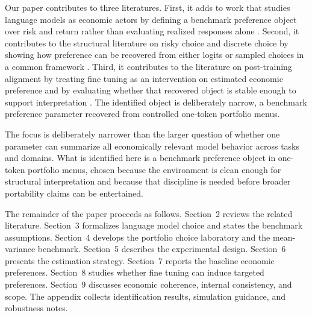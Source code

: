 Our paper contributes to three literatures. First, it adds to work that studies language models as economic actors by defining a benchmark preference object over risk and return rather than evaluating realized responses alone \citep{horton2023large, chen2023emergence, raman2024steer}. Second, it contributes to the structural literature on risky choice and discrete choice by showing how preference can be recovered from either logits or sampled choices in a common framework \citep{harrison2008risk, choi2007consistency, cohen2007estimating, tanaka2010risk, barseghyan2018estimating, luce1959individual, mcfadden1972conditional}. Third, it contributes to the literature on post-training alignment by treating fine tuning as an intervention on estimated economic preference and by evaluating whether that recovered object is stable enough to support interpretation \citep{christiano2017deep, ouyang2022training, rafailov2023direct, lu2025aligning}. The identified object is deliberately narrow, a benchmark preference parameter recovered from controlled one-token portfolio menus.

The focus is deliberately narrower than the larger question of whether one parameter can summarize all economically relevant model behavior across tasks and domains. What is identified here is a benchmark preference object in one-token portfolio menus, chosen because the environment is clean enough for structural interpretation and because that discipline is needed before broader portability claims can be entertained.

The remainder of the paper proceeds as follows. Section~2 reviews the related literature. Section~3 formalizes language model choice and states the benchmark assumptions. Section~4 develops the portfolio choice laboratory and the mean-variance benchmark. Section~5 describes the experimental design. Section~6 presents the estimation strategy. Section~7 reports the baseline economic preferences. Section~8 studies whether fine tuning can induce targeted preferences. Section~9 discusses economic coherence, internal consistency, and scope. The appendix collects identification results, simulation guidance, and robustness notes.
